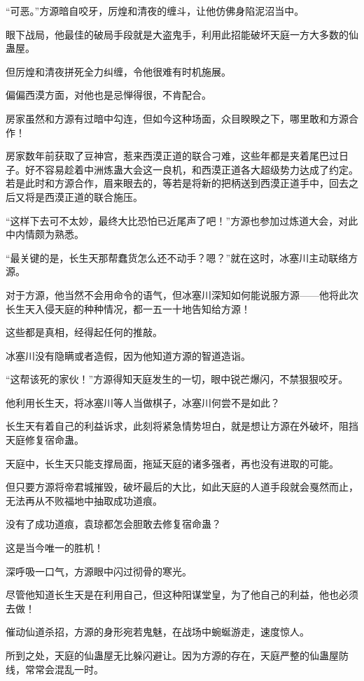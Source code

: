 \begin{this_body}
“可恶。”方源暗自咬牙，厉煌和清夜的缠斗，让他仿佛身陷泥沼当中。

眼下战局，他最佳的破局手段就是大盗鬼手，利用此招能破坏天庭一方大多数的仙蛊屋。

但厉煌和清夜拼死全力纠缠，令他很难有时机施展。

偏偏西漠方面，对他也是忌惮得很，不肯配合。

房家虽然和方源有过暗中勾连，但如今这种场面，众目睽睽之下，哪里敢和方源合作！

房家数年前获取了豆神宫，惹来西漠正道的联合刁难，这些年都是夹着尾巴过日子。好不容易趁着中洲炼蛊大会这一良机，和西漠正道各大超级势力达成了约定。若是此时和方源合作，眉来眼去的，等若是将新的把柄送到西漠正道手中，回去之后又将是西漠正道的联合施压。

“这样下去可不太妙，最终大比恐怕已近尾声了吧！”方源也参加过炼道大会，对此中内情颇为熟悉。

“最关键的是，长生天那帮蠢货怎么还不动手？嗯？”就在这时，冰塞川主动联络方源。

对于方源，他当然不会用命令的语气，但冰塞川深知如何能说服方源——他将此次长生天入侵天庭的种种情况，都一五一十地告知给方源！

这些都是真相，经得起任何的推敲。

冰塞川没有隐瞒或者造假，因为他知道方源的智道造诣。

“这帮该死的家伙！”方源得知天庭发生的一切，眼中锐芒爆闪，不禁狠狠咬牙。

他利用长生天，将冰塞川等人当做棋子，冰塞川何尝不是如此？

长生天有着自己的利益诉求，此刻将紧急情势坦白，就是想让方源在外破坏，阻挡天庭修复宿命蛊。

天庭中，长生天只能支撑局面，拖延天庭的诸多强者，再也没有进取的可能。

但只要方源将帝君城摧毁，破坏最后的大比，如此天庭的人道手段就会戛然而止，无法再从不败福地中抽取成功道痕。

没有了成功道痕，袁琼都怎会胆敢去修复宿命蛊？

这是当今唯一的胜机！

深呼吸一口气，方源眼中闪过彻骨的寒光。

尽管他知道长生天是在利用自己，但这种阳谋堂皇，为了他自己的利益，他也必须去做！

催动仙道杀招，方源的身形宛若鬼魅，在战场中蜿蜒游走，速度惊人。

所到之处，天庭的仙蛊屋无比躲闪避让。因为方源的存在，天庭严整的仙蛊屋防线，常常会混乱一时。


\end{this_body}

